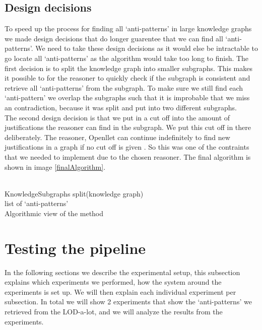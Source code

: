 \documentclass[11pt,letterpaper ,oneside ]{book}
\begin{document}
\section{Design decisions}
To speed up the process for finding all `anti-patterns' in large knowledge graphs we made design decisions that do longer guarentee that we can find all `anti-patterns'. We need to take these design decisions as it would else be intractable to go locate all `anti-patterns' as the algorithm would take too long to finish. 
The first decision is to split the knowledge graph into smaller subgraphs. This makes it possible to for the reasoner to quickly check if the subgraph is consistent and retrieve all `anti-patterns' from the subgraph. To make sure we still find each `anti-pattern' we overlap the subgraphs such that it is improbable that we miss an contradiction, because it was split and put into two different subgraphs.\\
The second design decision is that we put in a cut off into the amount of justifications the reasoner can find in the subgraph. We put this cut off in there deliberately. The reasoner, Openllet can continue indefinitely to find new justifications in a graph if no cut off is given \cite{Openllet:2019}. So this was one of the contraints that we needed to implement due to the chosen reasoner. 
The final algorithm is shown in image \ref{finalAlgorithm}.\\
\\
\begin{algorithm}[H]
	KnowledgeSubgraphs split(knowledge graph)\\
	
	\Return list of `anti-patterns'\\
	\caption{Algorithmic view of the method}
	\label{finalAlgorithm}
\end{algorithm}

\newpage
\chapter{Testing the pipeline}\label{Experiments}
In the following sections we describe the experimental setup, this subsection explains which experiments we performed, how the system around the experiments is set up. We will then explain each individual experiment per subsection. In total we will show 2 experiments that show the `anti-patterns' we retrieved from the LOD-a-lot, and we will analyze the results from the experiments. 
\end{document}
